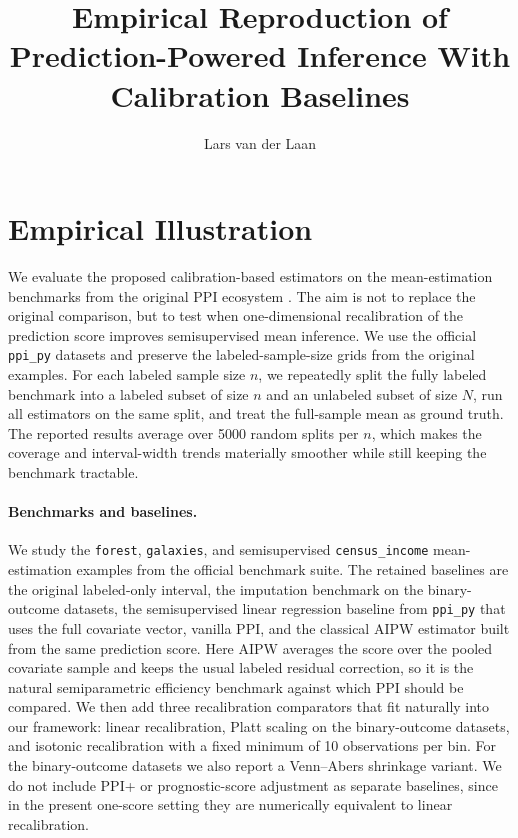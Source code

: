 \documentclass{article}
\title{Empirical Reproduction of Prediction-Powered Inference With Calibration Baselines}
\author{Lars van der Laan}
\begin{document}
\maketitle

\section{Empirical Illustration}
\label{sec:empirical}
We evaluate the proposed calibration-based estimators on the mean-estimation benchmarks from the original PPI ecosystem \citep{ppi2023,angelopoulos2023ppi}. The aim is not to replace the original comparison, but to test when one-dimensional recalibration of the prediction score improves semisupervised mean inference. We use the official \texttt{ppi\_py} datasets and preserve the labeled-sample-size grids from the original examples. For each labeled sample size \(n\), we repeatedly split the fully labeled benchmark into a labeled subset of size \(n\) and an unlabeled subset of size \(N\), run all estimators on the same split, and treat the full-sample mean as ground truth. The reported results average over 5000 random splits per \(n\), which makes the coverage and interval-width trends materially smoother while still keeping the benchmark tractable.

\paragraph{Benchmarks and baselines.}
We study the \texttt{forest}, \texttt{galaxies}, and semisupervised \texttt{census\_income} mean-estimation examples from the official benchmark suite. The retained baselines are the original labeled-only interval, the imputation benchmark on the binary-outcome datasets, the semisupervised linear regression baseline from \texttt{ppi\_py} that uses the full covariate vector, vanilla PPI, and the classical AIPW estimator built from the same prediction score. Here AIPW averages the score over the pooled covariate sample and keeps the usual labeled residual correction, so it is the natural semiparametric efficiency benchmark against which PPI should be compared. We then add three recalibration comparators that fit naturally into our framework: linear recalibration, Platt scaling on the binary-outcome datasets, and isotonic recalibration with a fixed minimum of 10 observations per bin. For the binary-outcome datasets we also report a Venn--Abers shrinkage variant. We do not include PPI+ or prognostic-score adjustment as separate baselines, since in the present one-score setting they are numerically equivalent to linear recalibration.
\end{document}
